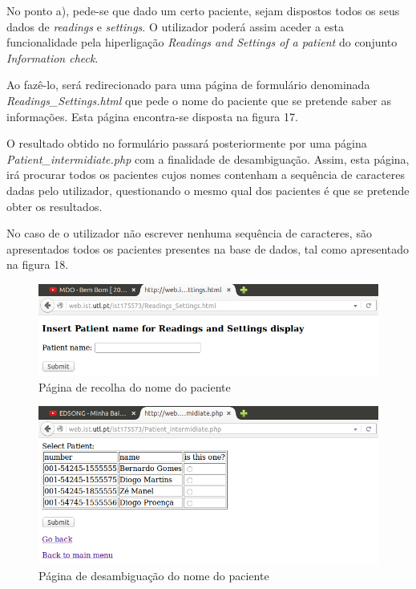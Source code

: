 \documentclass[a4paper]{article}
\begin{document}
No ponto a), pede-se que dado um certo paciente, sejam dispostos todos os seus dados de \textit{readings} e \textit{settings}. O utilizador poderá assim aceder a esta funcionalidade pela hiperligação \textit{Readings and Settings of a patient} do conjunto \textit{Information check}.

Ao fazê-lo, será redirecionado para uma página de formulário denominada \textit{Readings\_Settings.html} que pede o nome do paciente que se pretende saber as informações. Esta página encontra-se disposta na figura 17.

O resultado obtido no formulário passará posteriormente por uma página \textit{Patient\_intermidiate.php} com a finalidade de desambiguação. Assim, esta página, irá procurar todos os pacientes cujos nomes contenham a sequência de caracteres dadas pelo utilizador, questionando o mesmo qual dos pacientes é que se pretende obter os resultados.

No caso de o utilizador não escrever nenhuma sequência de caracteres, são apresentados todos os pacientes presentes na base de dados, tal como apresentado na figura 18.

\begin{figure}[ht!]
\centering
\includegraphics[scale=0.53]{Readings_Settings_html.png}
\caption{Página de recolha do nome do paciente}
\end{figure}

\begin{figure}[ht!]
\centering
\includegraphics[scale=0.53]{Patient_intermidiate_php.png}
\caption{Página de desambiguação do nome do paciente}
\end{figure}
\end{document}
